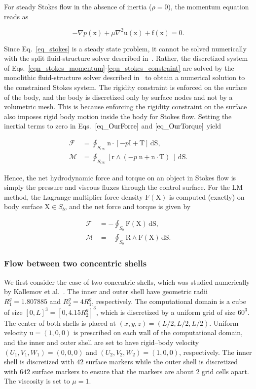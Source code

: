 \documentclass[review]{elsarticle}
\renewcommand{\vec}[1]{\bm{\mathrm{#1}}}
\newcommand{\V}[1]{\bm{\mathrm{#1}}}
\def \grad{\nabla}
\def \lap{\nabla^2}
\def \x{\vec{x}}
\def \n{\vec{n}}
\def \r{\vec{r}}
\def \u{\vec{u}}
\def \I{\vec{I}}
\def \F{\vec{F}}
\def \T{\vec{T}}
\def \cM{\vec{\mathcal{M}}}
\def \Sb{S_b}
\def  \Scv{S_\text{CV}}
\def \cF{\vec{\mathcal{F}}}
\def \F{\vec{F}}
\def \I{\vec{I}}
\def \R{\vec{R}}
\def \X{\vec{X}}
\def \f{\vec{f}}
\def \n{\vec{n}}
\def \u{\vec{u}}
\def \x{\vec{x}}
\def \grad{\nabla}
\def \lap{\nabla^2}
\def \dS{\,\mathrm{dS}}
\def \ndot{\n \cdot}
\def \rcross{\r \wedge}
\begin{document}
For steady Stokes flow in the absence of inertia ($\rho = 0$), the momentum equation reads as

\begin{equation}
\label{eq_stokes}
-\grad p(\x) + \mu \lap \u(\x) +\f(\x) =  \V 0.
\end{equation}

\noindent Since Eq.~\eqref{eq_stokes} is a steady state problem, it cannot
be solved numerically with the split fluid-structure solver described in~\cite{Bhalla13}.
Rather, the discretized system of Eqs.~\eqref{eqn_stokes_momentum}-\eqref{eqn_stokes_constraint} 
are solved by the monolithic fluid-structure solver described in~\cite{Kallemov16} to obtain 
a numerical solution to the constrained Stokes system. The rigidity constraint is
enforced on the surface of the body, and the body is discretized
only by surface nodes and not by a volumetric mesh. This is because enforcing the rigidity 
constraint on the surface also imposes rigid body motion inside the body for 
Stokes flow. Setting the inertial terms to zero in Eqs.~$\eqref{eq_OurForce}$ and
$\eqref{eq_OurTorque}$ yield

\begin{align}
\cF &=  \oint_{\Scv} \ndot \left[-p \I + \T \right] \dS, \label{eq_cv_stokes_force} \\ 
\cM  &= \oint_{\Scv}  [\rcross (- p \; \n + \ndot \T) \;]  \dS. \label{eq_cv_stokes_torque}
\end{align}

\noindent Hence, the net hydrodynamic force and torque on an object in Stokes
flow is simply the pressure and viscous fluxes through the control surface. For 
the LM method, the Lagrange multiplier force density $\F(\X)$ is computed (exactly) on  
body surface $\X \in \Sb$, and the net force and torque is given by

\begin{align}
\cF &=  -\oint_{\Sb} \F(\X) \dS, \label{eq_lag_stokes_force}\\ 
\cM &= -\oint_{\Sb} \R \wedge \F(\X) \dS. \label{eq_lag_stokes_torque}
\end{align}

\subsubsection{Flow between two concentric shells}
We first consider the case of two concentric shells, which was studied numerically
by Kallemov et al.~\cite{Kallemov16}. The inner and outer shell have geometric
radii $R_1^g = 1.807885$ and $R_2^g = 4 R_1^g$, respectively. The computational
domain is a cube of size $[0,L]^3 = [0,4.15 R_2^g]^3$, which is discretized by a 
uniform grid of size $60^3$. The center of both shells is placed at $(x,y,z) = (L/2,L/2,L/2)$.
Uniform velocity $\u = (1,0,0)$ is prescribed on each wall of the computational domain, and the inner and
outer shell are set to have rigid--body velocity $(U_1,V_1,W_1) = (0,0,0)$ and 
$(U_2,V_2,W_2) = (1,0,0)$, respectively. The inner shell is discretized with $42$ surface markers
while the outer shell is discretized with $642$ surface markers to ensure that the markers
are about $2$ grid cells apart. The viscosity is set to $\mu = 1$.
\end{document}
